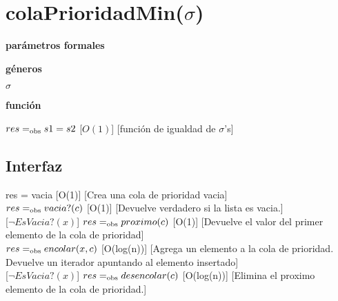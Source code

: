 \section{colaPrioridadMin($\sigma$)}

\textbf{parámetros formales}\parindent\\
\parbox{1.7cm}{\textbf{géneros}}  $\sigma$\\
\parbox[t]{1.7cm}{\textbf{función}}\parbox[t]{\textwidth-2\parindent-1.7cm}{%
{$res =_{\mathrm{obs}} s1 = s2$}
[$O(1)$]
[función de igualdad de $\sigma$'s]
}

\subsection{Interfaz}

{res = vacia}
[O(1)]
[Crea una cola de prioridad vacia]\\

{$res =_{\mathrm{obs}} vacia?(c)$}
[O(1)]
[Devuelve verdadero si la lista es vacia.]\\

[$\neg EsVacia?(x)$]
{$res =_{\mathrm{obs}} proximo(c)$}
[O(1)]
[Devuelve el valor del primer elemento de la cola de prioridad]\\

{$res =_{\mathrm{obs}} encolar(x,c)$}
[O(log(n))]
[Agrega un elemento a la cola de prioridad. Devuelve un iterador apuntando al elemento insertado]\\

[$\neg EsVacia?(x)$]
{$res =_{\mathrm{obs}} desencolar(c)$}
[O(log(n))]
[Elimina el proximo elemento de la cola de prioridad.]\\



